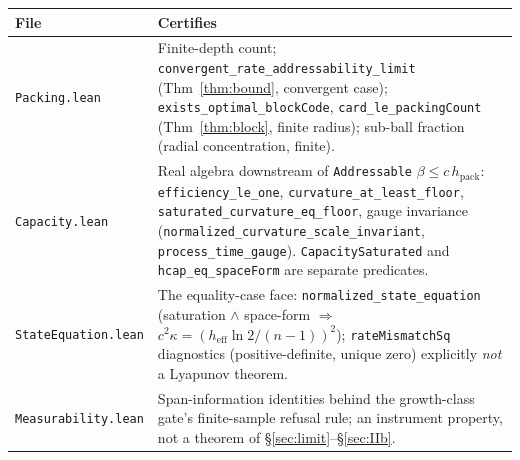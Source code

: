 \documentclass[11pt,reqno]{amsart}
\theoremstyle{plain}
\theoremstyle{definition}
\newcommand{\hpack}{h_{\mathrm{pack}}}
\newcommand{\heff}{h_{\mathrm{eff}}}
\begin{document}
\begin{center}\small
\begin{tabular}{@{}>{\raggedright\arraybackslash}p{3.3cm}>{\raggedright\arraybackslash}p{10.4cm}@{}}
\toprule
\textbf{File} & \textbf{Certifies} \\
\midrule
\texttt{Packing.lean} & Finite-depth count; \texttt{convergent\_rate\_addressability\_limit} (Thm~\ref{thm:bound}, convergent case); \texttt{exists\_optimal\_blockCode}, \texttt{card\_le\_packingCount} (Thm~\ref{thm:block}, finite radius); sub-ball fraction (radial concentration, finite). \\
\texttt{Capacity.lean} & Real algebra downstream of \texttt{Addressable} $\beta\le c\,\hpack$: \texttt{efficiency\_le\_one}, \texttt{curvature\_at\_least\_floor}, \texttt{saturated\_curvature\_eq\_floor}, gauge invariance (\texttt{normalized\_curvature\_scale\_invariant}, \texttt{process\_time\_gauge}). \texttt{CapacitySaturated} and \texttt{hcap\_eq\_spaceForm} are separate predicates. \\
\texttt{StateEquation.lean} & The equality-case face: \texttt{normalized\_state\_equation} (saturation $\wedge$ space-form $\Rightarrow$ $c^2\kappa=(\heff\ln2/(n-1))^2$); \texttt{rateMismatchSq} diagnostics (positive-definite, unique zero) explicitly \emph{not} a Lyapunov theorem. \\
\texttt{Measurability.lean} & Span-information identities behind the growth-class gate's finite-sample refusal rule; an instrument property, not a theorem of \S\ref{sec:limit}--\S\ref{sec:IIb}. \\
\bottomrule
\end{tabular}
\end{center}
\end{document}
